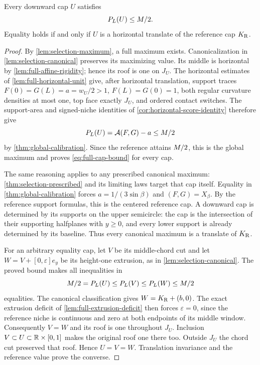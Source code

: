 \begin{theorem}\label{thm:full-cap-bound}
Every downward cap $U$ satisfies
\begin{equation}\label{eq:full-cap-bound}
 P_L(U)\le M/2.
\end{equation}
Equality holds if and only if $U$ is a horizontal translate of
the reference cap $K_{\mathrm R}$.
\end{theorem}
\begin{proof}
By \cref{lem:selection-maximum}, a full maximum exists.
Canonicalization in \cref{lem:selection-canonical} preserves
its maximizing value. Its middle is horizontal by
\cref{lem:full-affine-rigidity}; hence its roof is one on $J_U$.
The horizontal estimates of \cref{lem:full-horizontal-unit}
give, after horizontal translation, support traces
$F(0)=G(L)=a=w_U/2>1$, $F(L)=G(0)=1$, both regular curvature
densities at most one, top face exactly $J_U$, and ordered
contact switches. The support-area and signed-niche identities
of \cref{cor:horizontal-score-identity} therefore give
\[
 P_L(U)=\mathcal A(F,G)-a\le M/2
\]
by \cref{thm:global-calibration}. Since the reference attains
$M/2$, this is the global maximum and proves
\cref{eq:full-cap-bound} for every cap.

The same reasoning applies to any prescribed canonical maximum:
\cref{thm:selection-prescribed} and its limiting laws target that
cap itself. Equality in \cref{thm:global-calibration} forces
$a=1/(3\sin\beta)$ and $(F,G)=X_\beta$. By the reference
support formulas, this is the centered reference cap. A downward
cap is determined by its supports on the upper semicircle:
the cap is the intersection of their supporting halfplanes with
$y\ge0$, and every lower support is already determined by its
baseline. Thus every canonical maximum is a translate of $K_{\mathrm R}$.

For an arbitrary equality cap, let $V$ be its middle-chord cut
and let $W=V+[0,\varepsilon]e_y$ be its height-one extrusion,
as in \cref{lem:selection-canonical}. The proved bound makes
all inequalities in
\[
 M/2=P_L(U)\le P_L(V)\le P_L(W)\le M/2
\]
equalities. The canonical classification gives $W=K_{\mathrm R}+(b,0)$.
The exact extrusion deficit of \cref{lem:full-extrusion-deficit}
then forces $\varepsilon=0$, since the reference niche is
continuous and zero at both endpoints of its middle window.
Consequently $V=W$ and its roof is one throughout $J_U$.
Inclusion $V\subset U\subset\mathbb{R}\times[0,1]$ makes the original
roof one there too. Outside $J_U$ the chord cut preserved that
roof. Hence $U=V=W$. Translation invariance and the reference
value prove the converse.
\end{proof}

